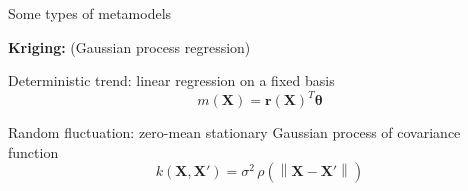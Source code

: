 \documentclass{beamer}
\begin{document}

\begin{frame}[t]{Some types of metamodels}

{\bf Kriging:} (Gaussian process regression)

Deterministic trend: linear regression on a fixed basis
\[
m(\boldsymbol{X}) = \boldsymbol{r(\boldsymbol{X})}^T \boldsymbol{\theta} 
\]

Random fluctuation: zero-mean stationary Gaussian process of covariance function 
\[
k(\boldsymbol{X}, \boldsymbol{X'}) = \sigma^2 \, \rho( \left\lVert \boldsymbol{X} - \boldsymbol{X'}  \right\rVert)
\]

\end{frame}
\end{document}
